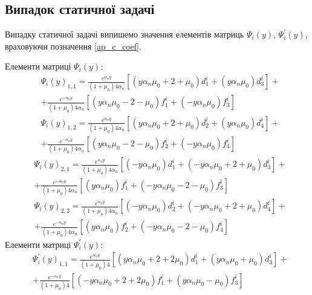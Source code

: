 \subsection*{Випадок статичної задачі}
Випадку статичної задачі випишемо значення елементів матриць $\Psi_i(y)$, $\Psi_i^{'}(y)$, враховуючи позначення \eqref{ap_c_coef}.

Елементи матриці $\Psi_i(y)$:
\begin{align*}
    &\Psi_i(y)_{1,1}=  \frac{e^{\alpha_n y}}{(1 + \mu_0) 4 \alpha_n} \left[ (y \alpha_n \mu_0 + 2 + \mu_0)d_1^i + (y \alpha_n \mu_0)d_3^i \right] + \\ 
    &+ \frac{e^{-\alpha_n y}}{(1 + \mu_0) 4 \alpha_n} \left[ (y \alpha_n \mu_0 - 2 - \mu_0) f_1^i + (-y \alpha_n \mu_0) f_3^i \right]
\end{align*}
\begin{align*}
    &\Psi_i(y)_{1,2}=  \frac{e^{\alpha_n y}}{(1 + \mu_0) 4 \alpha_n} \left[ (y \alpha_n \mu_0 + 2 + \mu_0)d_2^i + (y \alpha_n \mu_0)d_4^i \right] + \\ 
    &+ \frac{e^{-\alpha_n y}}{(1 + \mu_0) 4 \alpha_n} \left[ (y \alpha_n \mu_0 - 2 - \mu_0) f_2^i + (-y \alpha_n \mu_0) f_4^i \right]
\end{align*}
\begin{align*}
    &\Psi_i(y)_{2,1}=  \frac{e^{\alpha_n y}}{(1 + \mu_0) 4 \alpha_n} \left[ (-y \alpha_n \mu_0) d_1^i + (-y \alpha_n \mu_0 + 2 + \mu_0) d_3^i \right] + \\ 
    &+ \frac{e^{-\alpha_n y}}{(1 + \mu_0) 4 \alpha_n} \left[ (y \alpha_n \mu_0) f_1^i + (-y \alpha_n \mu_0 - 2 - \mu_0) f_3^i \right]
\end{align*}
\begin{align*}
    &\Psi_i(y)_{2,2}=  \frac{e^{\alpha_n y}}{(1 + \mu_0) 4 \alpha_n} \left[ (-y \alpha_n \mu_0) d_2^i + (-y \alpha_n \mu_0 + 2 + \mu_0) d_4^i \right] + \\ 
    &+ \frac{e^{-\alpha_n y}}{(1 + \mu_0) 4 \alpha_n} \left[ (y \alpha_n \mu_0) f_2^i + (-y \alpha_n \mu_0 - 2 - \mu_0) f_4^i \right]
\end{align*}
Елементи матриці $\Psi_i^{'}(y)$:
\begin{align*}
    &\Psi_i^{'}(y)_{1,1}=  \frac{e^{\alpha_n y}}{(1 + \mu_0) 4} \left[ (y \alpha_n \mu_0 + 2 + 2 \mu_0)d_1^i + (y \alpha_n \mu_0 + \mu_0)d_3^i \right] + \\ 
    &+ \frac{e^{-\alpha_n y}}{(1 + \mu_0) 4} \left[ (-y \alpha_n \mu_0 + 2 + 2 \mu_0) f_1^i + (y \alpha_n \mu_0 - \mu_0) f_3^i \right]
\end{align*}
